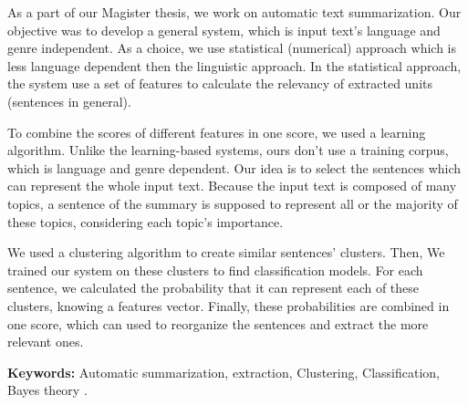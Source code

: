 \documentclass[a4paper,12pt,oneside]{../use/ESIthesis}
\begin{document}
As a part of our Magister thesis, we work on automatic text summarization. 
Our objective was to develop a general system, which is input text's language and genre independent. 
As a choice, we use statistical (numerical) approach which is less language dependent then the linguistic approach. 
In the statistical approach, the system use a set of features to calculate the relevancy of extracted units (sentences in general). 

To combine the scores of different features in one score, we used a learning algorithm. 
Unlike the learning-based systems, ours don't use a training corpus, which is language and genre dependent. 
Our idea is to select the sentences which can represent the whole input text. 
Because the input text is composed of many topics, a sentence of the summary is supposed to represent all or the majority of these topics, considering each topic's importance. 

We used a clustering algorithm to create similar sentences' clusters. 
Then, We trained our system on these clusters to find classification models. 
For each sentence, we calculated the probability that it can represent each of these clusters, knowing a features vector.
Finally, these probabilities are combined in one score, which can used to reorganize the sentences and extract the more relevant ones.

\vspace*{\fill}


\textbf{Keywords: }
Automatic summarization, 
extraction, 
Clustering, 
Classification, 
Bayes theory
.

\clearpage

\chapter*{}
\end{document}
